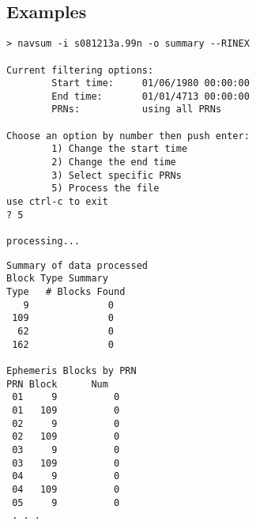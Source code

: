 \subsection{Examples}
\begin{\outputsize}
\begin{lstlisting}
> navsum -i s081213a.99n -o summary --RINEX

Current filtering options:
        Start time:     01/06/1980 00:00:00
        End time:       01/01/4713 00:00:00
        PRNs:           using all PRNs

Choose an option by number then push enter:
        1) Change the start time
        2) Change the end time
        3) Select specific PRNs
        5) Process the file
use ctrl-c to exit
? 5

processing...
\end{lstlisting}
\begin{verbatim}
Summary of data processed
Block Type Summary
Type   # Blocks Found
   9              0
 109              0
  62              0
 162              0

Ephemeris Blocks by PRN
PRN Block      Num
 01     9          0
 01   109          0
 02     9          0
 02   109          0
 03     9          0
 03   109          0
 04     9          0
 04   109          0
 05     9          0
 . . .
\end{verbatim}

\end{\outputsize}

%
